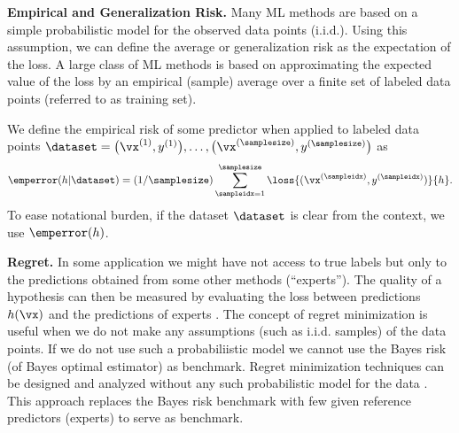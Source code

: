 \documentclass[12pt]{report}
\begin{document}
\begin{center}
\end{center}

{\bf Empirical and Generalization Risk.} 
Many ML methods are based on a simple probabilistic model for the 
observed data points (i.i.d.). Using this assumption, we can define the 
average or generalization risk as the expectation of the loss. A large class 
of ML methods is based on approximating the expected value of the loss 
by an empirical (sample) average over a finite set of labeled data points 
(referred to as training set). 

We define the empirical risk of some predictor when applied to labeled data points $\dataset=\big(\vx^{(1)},y^{(1)}\big),\ldots,\big(\vx^{(\samplesize)},y^{(\samplesize)}\big)$ 
as 
\begin{equation} 
\label{eq_def_emp_error_101}
\emperror(h|\dataset) = (1/\samplesize)\sum_{\sampleidx=1}^{\samplesize} \loss{(\vx^{(\sampleidx)},y^{(\sampleidx)})}{h}.  
\end{equation} 
To ease notational burden, if the dataset $\dataset$ is clear from the context, 
we use $\emperror(h)$. 




{\bf Regret.} In some application we might have not access to true labels 
but only to the predictions obtained from some other methods (``experts''). 
The quality of a hypothesis can then be measured by evaluating the loss 
between predictions $h(\vx)$ and the predictions of experts \cite{HazanOCO}. 
The concept of regret minimization is useful when we do not make any 
assumptions (such as i.i.d. samples) of the data points. If we do not use 
such a probabiliistic model we cannot use the Bayes risk (of Bayes optimal 
estimator) as benchmark. Regret minimization 
techniques can be designed and analyzed without any such probabilistic 
model for the data \cite{PredictionLearningGames}. This approach replaces 
the Bayes risk benchmark with few given reference predictors (experts) to 
serve as benchmark. 
\end{document}

